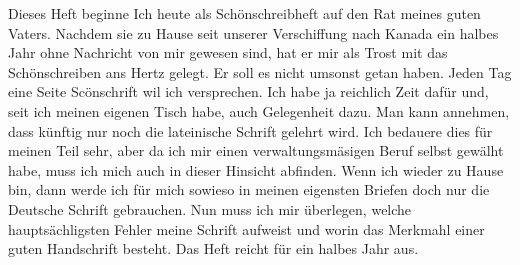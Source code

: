 \def\day{25.8.1942}
\mktitle

Dieses Heft beginne Ich heute als Sch\"{o}nschreibheft auf den Rat meines guten Vaters.
Nachdem sie zu Hause seit unserer Verschiffung nach Kanada ein halbes Jahr ohne Nachricht von mir gewesen sind, hat er mir als Trost mit das Sch\"{o}nschreiben ans Hertz gelegt.
Er soll es nicht umsonst getan haben.
Jeden Tag eine Seite Sc\"{o}nschrift wil ich versprechen.
Ich habe ja reichlich Zeit daf\"{u}r und, seit ich meinen eigenen Tisch habe, auch Gelegenheit dazu.
Man kann annehmen, dass k\"{u}nftig nur noch die lateinische Schrift gelehrt wird.
Ich bedauere dies f\"{u}r meinen Teil sehr, aber da ich mir einen verwaltungsm\"{a}sigen Beruf selbst gew\"{a}lht habe, muss ich mich auch in dieser Hinsicht abfinden.
Wenn ich wieder zu Hause bin, dann werde ich f\"{u}r mich sowieso in meinen eigensten Briefen doch nur die Deutsche Schrift gebrauchen.
Nun muss ich mir \"{u}berlegen, welche haupts\"{a}chligsten Fehler meine Schrift aufweist und worin das Merkmahl einer guten Handschrift besteht.
Das Heft reicht f\"{u}r ein halbes Jahr aus.

\clearpage
